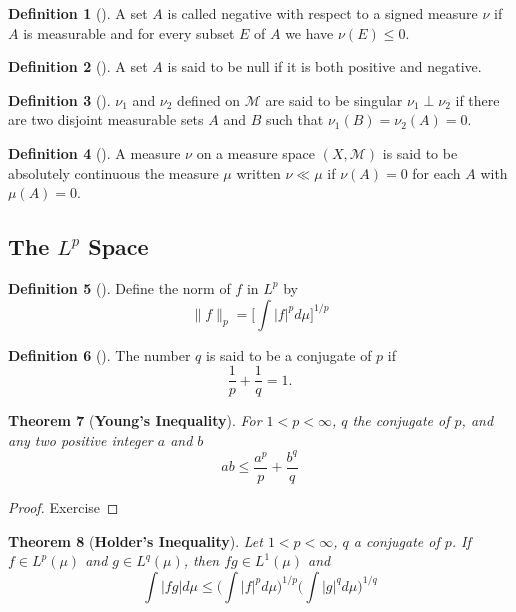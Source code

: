 \documentclass[	DIV=calc,paper=a4,fontsize=11pt]{scrartcl}	 	%
\newtheorem{thm}{Theorem}[section]
\theoremstyle{definition}
\newtheorem{defn}[thm]{Definition}
\theoremstyle{plain}
\theoremstyle{remark}
\begin{document}
\begin{defn}[\textbf{\color{blue}{Negative set}}]
A set $A$ is called negative with respect to a signed measure $\nu$ if $A$ is measurable and for every subset $E$ of $A$ we have $\nu(E)\leq 0$.
\end{defn}

\begin{defn}[\textbf{\color{blue}{Null set}}]
A set $A$ is said to be null if it is both positive and negative.
\end{defn}

\begin{defn}[\textbf{\color{blue}{Singular}}]
$\nu_1$ and $\nu_2$ defined on $\mathcal{M}$ are said to be singular $\nu_1\perp\nu_2$ if there are two disjoint measurable sets $A$ and $B$ such that $\nu_1(B)=\nu_2(A)=0$.
\end{defn}

\begin{defn}[\textbf{\color{blue}{Absolute Continuous Measure}}]
A measure $\nu$ on a measure space $(X,\mathcal{M})$ is said to be absolutely continuous the measure $\mu$ written $\nu\ll\mu$ if $\nu(A)=0$ for each $A$ with $\mu(A)=0$.
\end{defn}

\subsection{The $L^p$ Space}

\begin{defn}[\textbf{\color{blue}{Norm}}]
Define the norm of $f$ in $L^p$ by
\[\|f\|_p=\biggl[\int |f|^pd\mu\biggl]^{1/p}\]
\end{defn}
\begin{defn}[\textbf{\color{blue}{Conjugate Power}}]
The number $q$ is said to be a conjugate of $p$ if
\[\frac{1}{p}+\frac{1}{q}=1.\]
\end{defn}
\begin{thm}[\textbf{Young's Inequality}]
For $1<p<\infty$, $q$ the conjugate of $p$, and any two positive integer $a$ and $b$
\[ab\leq \frac{a^p}{p}+\frac{b^q}{q}\]
\end{thm}

\begin{proof}
Exercise
\end{proof}
\begin{thm}[\textbf{Holder's Inequality}]
Let $1<p<\infty$, $q$ a conjugate of $p$. If $f\in L^p(\mu)$ and $g\in L^q(\mu)$, then $fg\in L^1(\mu)$ and
\[\int |fg|d\mu \leq \biggl(\int|f|^pd\mu\biggl)^{1/p}\biggl(\int |g|^qd\mu\biggl)^{1/q}\]
\end{thm}
\end{document}
